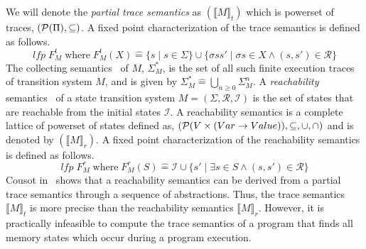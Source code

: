 {%
We will denote the \emph{partial trace semantics} as $(\llbracket M \rrbracket_{t})$ 
which is powerset of traces, $(\mathcal{P}(\Pi), \subseteq)$.  
%
A fixed point characterization of the trace semantics is defined as follows. 
%
\[
  \mathit{lfp}\; F_{M}^{t}\; \text{where}\; F_{M}^{t}(X) \mathrel{\hat=} \{s \mid s \in
  \Sigma\} \cup \{\sigma ss' \mid \sigma s \in X \wedge (s,s') \in \mathcal{R} \}
\]
%
%
The collecting semantics~\cite{Cousot04} of $M$, $\Sigma_{M}^{*}$, 
is the set of all such finite execution traces of transition system $M$, and is given by 
$\Sigma_M^*\mathrel{\hat=} \bigcup_{n\geq0}\Sigma_M^{n}$. 
%
%
%
A \emph{reachability} semantics~\cite{minethesis} of a state transition 
system $M=(\Sigma, \mathcal{R},\mathcal{I})$ is the set of states that are 
reachable from the initial states $\mathcal{I}$. A reachability
semantics is a complete lattice of powerset of
states defined as, $(\mathcal{P}(V \times (Var \rightarrow Value)), \subseteq,
\cup, \cap)$ and is denoted by $(\llbracket M \rrbracket_{r})$. 
%
A fixed point characterization of the reachability semantics is
defined as follows.
\[
  \mathit{lfp}\; F_M^{r}\; \text{where}\; F_{M}^{r}(S) \mathrel{\hat=} \mathcal{I} \cup \{s' \mid
   \exists s \in S \wedge (s,s') \in \mathcal{R} \} 
\]
%
Cousot in~\cite{Cousot04} shows that a reachability semantics can be derived
from a partial trace semantics through a sequence of abstractions.  Thus, 
the trace semantics $\llbracket M \rrbracket_{t}$ is more precise than the 
reachability semantics $\llbracket M \rrbracket_{r}$.  However, it is
practically infeasible to compute the trace semantics of a program 
that finds all memory states which occur during a program execution. 
%
}
